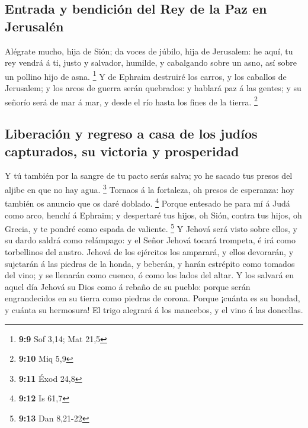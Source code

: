 \hypertarget{entrada-y-bendiciuxf3n-del-rey-de-la-paz-en-jerusaluxe9n}{%
\subsection{Entrada y bendición del Rey de la Paz en
Jerusalén}\label{entrada-y-bendiciuxf3n-del-rey-de-la-paz-en-jerusaluxe9n}}

 Alégrate mucho, hija de Sión; da voces de júbilo, hija de
Jerusalem: he aquí, tu rey vendrá á ti, justo y salvador, humilde, y
cabalgando sobre un asno, así sobre un pollino hijo de asna. \footnote{\textbf{9:9}
  Sof 3,14; Mat 21,5}  Y de Ephraim destruiré los carros,
y los caballos de Jerusalem; y los arcos de guerra serán quebrados: y
hablará paz á las gentes; y su señorío será de mar á mar, y desde el río
hasta los fines de la tierra. \footnote{\textbf{9:10} Miq 5,9}

\hypertarget{liberaciuxf3n-y-regreso-a-casa-de-los-juduxedos-capturados-su-victoria-y-prosperidad}{%
\subsection{Liberación y regreso a casa de los judíos capturados, su
victoria y
prosperidad}\label{liberaciuxf3n-y-regreso-a-casa-de-los-juduxedos-capturados-su-victoria-y-prosperidad}}

 Y tú también por la sangre de tu pacto serás salva; yo
he sacado tus presos del aljibe en que no hay agua. \footnote{\textbf{9:11}
  Éxod 24,8}  Tornaos á la fortaleza, oh presos de
esperanza: hoy también os anuncio que os daré doblado. \footnote{\textbf{9:12}
  Is 61,7}  Porque entesado he para mí á Judá como arco,
henchí á Ephraim; y despertaré tus hijos, oh Sión, contra tus hijos, oh
Grecia, y te pondré como espada de valiente. \footnote{\textbf{9:13} Dan
  8,21-22}  Y Jehová será visto sobre ellos, y su dardo
saldrá como relámpago: y el Señor Jehová tocará trompeta, é irá como
torbellinos del austro.  Jehová de los ejércitos los
amparará, y ellos devorarán, y sujetarán á las piedras de la honda, y
beberán, y harán estrépito como tomados del vino; y se llenarán como
cuenco, ó como los lados del altar.  Y los salvará en
aquel día Jehová su Dios como á rebaño de su pueblo: porque serán
engrandecidos en su tierra como piedras de corona. 
Porque ¡cuánta es su bondad, y cuánta su hermosura! El trigo alegrará á
los mancebos, y el vino á las doncellas.

